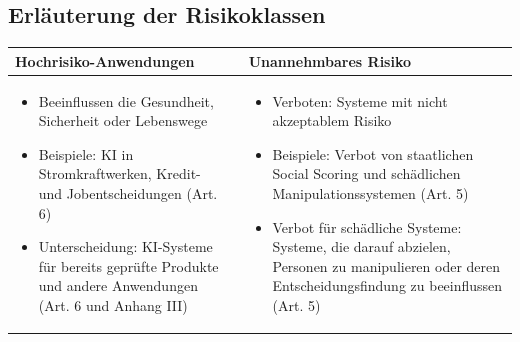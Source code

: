 \documentclass[aspectratio=169,16pt,xcolor=table]{beamer}
\begin{document}
\subsection{Erläuterung der Risikoklassen}
    \begin{frame} %
    \begin{center}

\begin{tabular}{|p{6.5cm}|@{}p{1cm}@{}|p{6.5cm}|}
    \hline
    \small
    \cellcolor{red!25}\textbf{Hochrisiko-Anwendungen} & \textbf{} & \cellcolor{red!50}\textbf{Unannehmbares Risiko} \\
    \hline
            \small
            \begin{itemize}
                \item Beeinflussen die Gesundheit, Sicherheit oder Lebenswege 
                \item Beispiele: KI in Stromkraftwerken, Kredit- und Jobentscheidungen (Art. 6)
                \item Unterscheidung: KI-Systeme für bereits geprüfte Produkte und andere Anwendungen (Art. 6 und Anhang III)
            \end{itemize}
            & & 

            \small
            \begin{itemize}
                \item Verboten: Systeme mit nicht akzeptablem Risiko 
                \item Beispiele: Verbot von staatlichen Social Scoring und schädlichen Manipulationssystemen (Art. 5) 
                \item Verbot für schädliche Systeme: Systeme, die darauf abzielen, Personen zu manipulieren oder deren Entscheidungsfindung zu beeinflussen (Art. 5)
            \end{itemize} \\
        \hline
    \end{tabular}

    \end{center}
\end{frame}

\end{document}
